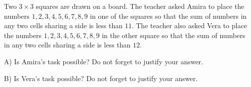 Two $3 \times 3$ squares are drawn on a board. The teacher asked Amira to place the numbers $1,2,3,4,5,6,7,8,9$ in one of the squares so that the sum of numbers in any two cells sharing a side is less than $11$. The teacher also asked Vera to place the numbers $1,2,3,4,5,6,7,8,9$ in the other square so that the sum of numbers in any two cells sharing a side is less than $12$.

A) Is Amira's task possible? Do not forget to justify your answer.

B) Is Vera's task possible? Do not forget to justify your answer.
